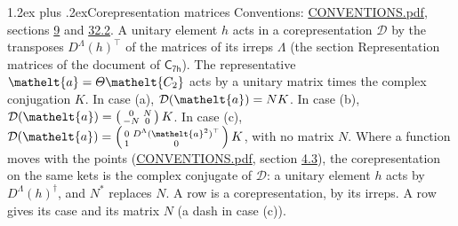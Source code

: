 \documentclass[10pt,a4paper]{article}
\makeatletter
\renewcommand\section{\@startsection{section}{1}{\z@}{-3ex plus -1ex minus -.2ex}%
  {1.2ex plus .2ex}{\normalfont\large\sffamily\bfseries\color{parttitle}}}
\numberwithin{equation}{section}
\newcommand{\eltfont}[1]{{\let\sigma\eltsigma\mathelt{#1}}}
\newcommand{\grp}[1]{\mathsf{#1}}
\newcommand{\elt}[1]{\eltfont{#1}}
\makeatother
\begin{document}
\section{Corepresentation matrices}\label{s:corep_matrices}
Conventions: \href{../../CONVENTIONS.pdf}{CONVENTIONS.pdf}, sections \href{../../../rotation/CONVENTIONS.pdf\#conv.9}{9} and \href{../../CONVENTIONS.pdf\#conv.32.2}{32.2}.
A unitary element $h$ acts in a corepresentation $\mathcal{D}$ by the transposes $D^{\Lambda}(h)^{\top}$ of the matrices of its irreps $\Lambda$ (the section Representation matrices of the document of \href{../../../rotation/data/pdf/C7h.pdf}{$\grp{C_{7h}}$}). The representative $\elt{a} = \varTheta\elt{C_{2}}$ acts by a unitary matrix times the complex conjugation $K$.
In case (a), $\mathcal{D}(\elt{a}) = NK$. In case (b), $\mathcal{D}(\elt{a}) = \left(\begin{smallmatrix} 0 & N \\ -N & 0 \end{smallmatrix}\right) K$. In case (c), $\mathcal{D}(\elt{a}) = \left(\begin{smallmatrix} 0 & D^{\Lambda}(\elt{a}^2)^{\top} \\ 1 & 0 \end{smallmatrix}\right) K$, with no matrix $N$.
Where a function moves with the points (\href{../../CONVENTIONS.pdf}{CONVENTIONS.pdf}, section \href{../../../rotation/CONVENTIONS.pdf\#conv.4.3}{4.3}), the corepresentation on the same kets is the complex conjugate of $\mathcal{D}$: a unitary element $h$ acts by $D^{\Lambda}(h)^{\dagger}$, and $N^{*}$ replaces $N$.
A row is a corepresentation, by its irreps. A row gives its case and its matrix $N$ (a dash in case (c)).
\end{document}
